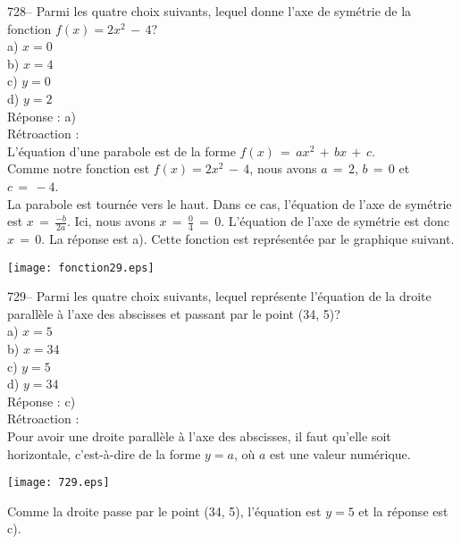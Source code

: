 ﻿\documentclass[letterpaper, 12pt]{article}
\begin{document}
728-- Parmi les quatre choix suivants, lequel donne l'axe de sym\'etrie de
la fonction $f(x)= 2x^{2}\,-\,4$?\\
a) $x=0$\\
b) $x=4$\\
c) $y=0$\\
d) $y=2$\\

R\'eponse : a)\\

R\'etroaction : \\
L'\'equation d'une parabole est de la forme
$f(x)\,=\,ax^2\,+\,bx\,+\,c$.\\
Comme notre fonction est $f(x)= 2x^{2}\,-\,4$, nous avons $a\,=\,2$,
$b\,=\,0$ et $c\,=\,-4$.\\
La parabole est tourn\'ee vers le haut. Dans ce cas, l'\'equation de
l'axe de sym\'etrie est $x\,=\, \frac{-b}{2a}$. Ici, nous avons
$x\,=\,\frac{0}{4}\,=\,0$. L'\'equation de l'axe de sym\'etrie est
donc $x\,=\,0$. La r\'eponse est a).
Cette fonction est repr\'esent\'ee par le graphique suivant.\\
    \begin{center}
    \texttt{[image: fonction29.eps]}
    \end{center}


729-- Parmi les quatre choix suivants, lequel repr\'esente l'\'equation de
la droite parall\`ele \`a l'axe des abscisses et passant par le point (34,
5)?\\
a) $x=5$\\
b) $x=34$\\
c) $y=5$\\
d) $y=34$\\

R\'eponse : c)\\

R\'etroaction : \\
Pour avoir une droite parall\`ele \`a l'axe des abscisses, il faut
qu'elle soit horizontale, c'est-\`a-dire de la forme $y=a$, o\`u $a$
est une valeur num\'erique.   \begin{center}
    \texttt{[image: 729.eps]}
    \end{center}
     Comme la droite passe par le point (34, 5), l'\'equation est
$y=5$ et la r\'eponse est c).\\
\end{document}
